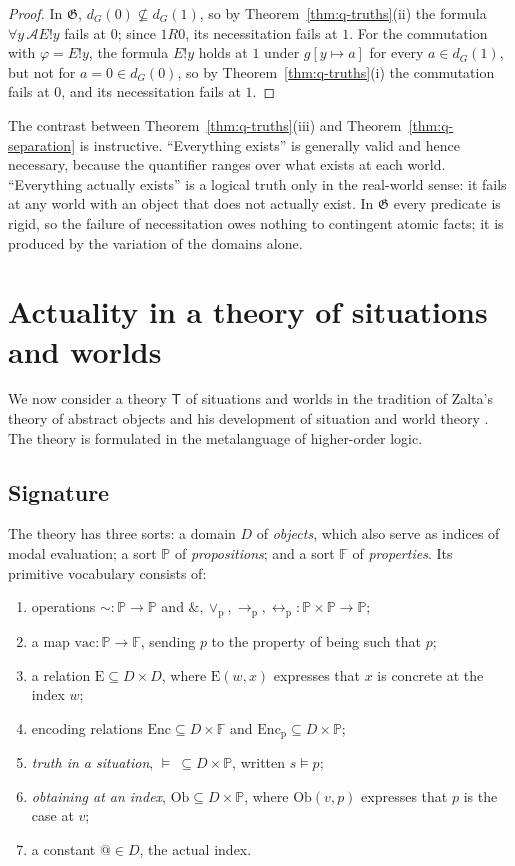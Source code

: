 \documentclass[11pt]{amsart}
\makeatletter
\theoremstyle{plain}
\theoremstyle{definition}
\theoremstyle{remark}
\newcommand{\Act}{\mathcal{A}}
\newcommand{\at}{@}
\newcommand{\Enc}{\mathrm{Enc}}
\newcommand{\Encp}{\mathrm{Enc}_{\mathrm{p}}}
\newcommand{\Obt}{\mathrm{Ob}}
\newcommand{\Conc}{\mathrm{E}}
\newcommand{\VAC}{\mathrm{vac}}
\newcommand{\Prop}{\mathbb{P}}
\newcommand{\Pty}{\mathbb{F}}
\newcommand{\Dom}{D}
\newcommand{\T}{\mathsf{T}}
\newcommand{\pneg}{\mathord{\sim}}
\newcommand{\pand}{\mathbin{\&}}
\newcommand{\por}{\mathbin{\vee_{\mathrm{p}}}}
\newcommand{\pimp}{\mathbin{\to_{\mathrm{p}}}}
\newcommand{\piff}{\mathbin{\leftrightarrow_{\mathrm{p}}}}
\makeatother
\begin{document}
\begin{proof}
In $\mathfrak{G}$, $d_G(0) \not\subseteq d_G(1)$, so by
Theorem~\ref{thm:q-truths}(ii) the formula $\forall y\,\Act E!y$ fails
at $0$; since $1 R 0$, its necessitation fails at $1$. For the
commutation with $\varphi = E!y$, the formula $E!y$ holds at $1$ under
$g[y \mapsto a]$ for every $a \in d_G(1)$, but not for $a = 0 \in
d_G(0)$, so by Theorem~\ref{thm:q-truths}(i) the commutation fails at
$0$, and its necessitation fails at $1$.
\end{proof}

The contrast between Theorem~\ref{thm:q-truths}(iii) and
Theorem~\ref{thm:q-separation} is instructive. ``Everything exists'' is
generally valid and hence necessary, because the quantifier ranges over
what exists at each world. ``Everything actually exists'' is a logical
truth only in the real-world sense: it fails at any world with an
object that does not actually exist. In $\mathfrak{G}$ every predicate
is rigid, so the failure of necessitation owes nothing to contingent
atomic facts; it is produced by the variation of the domains alone.

\section{Actuality in a theory of situations and worlds}
\label{sec:theory}

We now consider a theory $\T$ of situations and worlds in the tradition
of Zalta's theory of abstract objects \cite{zalta1983,zalta1988book}
and his development of situation and world theory \cite{zalta1993}. The
theory is formulated in the metalanguage of higher-order logic.

\subsection{Signature}

The theory has three sorts: a domain $\Dom$ of \emph{objects}, which
also serve as indices of modal evaluation; a sort $\Prop$ of
\emph{propositions}; and a sort $\Pty$ of \emph{properties}. Its
primitive vocabulary consists of:
\begin{enumerate}[label=(\alph*)]
\item operations $\pneg\colon \Prop \to \Prop$ and
  $\pand, \por, \pimp, \piff\colon \Prop \times \Prop \to \Prop$;
\item a map $\VAC\colon \Prop \to \Pty$, sending $p$ to the property
  of being such that $p$;
\item a relation $\Conc \subseteq \Dom \times \Dom$, where
  $\Conc(w,x)$ expresses that $x$ is concrete at the index $w$;
\item encoding relations $\Enc \subseteq \Dom \times \Pty$ and
  $\Encp \subseteq \Dom \times \Prop$;
\item \emph{truth in a situation}, $\models\ \subseteq \Dom \times
  \Prop$, written $s \models p$;
\item \emph{obtaining at an index}, $\Obt \subseteq \Dom \times
  \Prop$, where $\Obt(v,p)$ expresses that $p$ is the case at $v$;
\item a constant $\at \in \Dom$, the actual index.
\end{enumerate}
\end{document}
